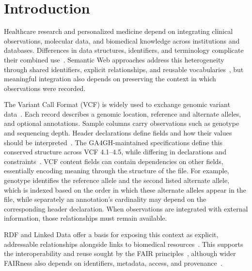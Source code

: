 \section{Introduction}

Healthcare research and personalized medicine depend on integrating clinical observations, molecular data, and biomedical knowledge across institutions and databases.
Differences in data structures, identifiers, and terminology complicate their combined use~\cite{gaudetblavignac2021sphn,putman2024monarch}.
Semantic Web approaches address this heterogeneity through shared identifiers, explicit relationships, and reusable vocabularies~\cite{smith2007obo,belleau2008bio2rdf}, but meaningful integration also depends on preserving the context in which observations were recorded.

The Variant Call Format (VCF) is widely used to exchange genomic variant data~\cite{danecek2011vcf}.
Each record describes a genomic location, reference and alternate alleles, and optional annotations.
Sample columns carry observations such as genotype and sequencing depth.
Header declarations define fields and how their values should be interpreted~\cite{vcf45}.
The GA4GH-maintained specifications define this conserved structure across VCF 4.1--4.5, while differing in declarations and constraints~\cite{htsspecs}.
VCF content fields can contain dependencies on other fields, essentially encoding meaning through the structure of the file.
For example, genotype  identifies the reference allele and the second listed alternate allele, which is indexed based on the order in which these alternate alleles appear in the file, while separately an annotation's cardinality may depend on the corresponding header declaration.
When observations are integrated with external information, those relationships must remain available.

RDF and Linked Data offer a basis for exposing this context as explicit, addressable relationships alongside links to biomedical resources~\cite{decker2000semantic,bizer2009linked,lubin2017variantfile}.
This supports the interoperability and reuse sought by the FAIR principles~\cite{wilkinson2016fair}, although wider FAIRness also depends on identifiers, metadata, access, and provenance~\cite{bahim2020fair}.

